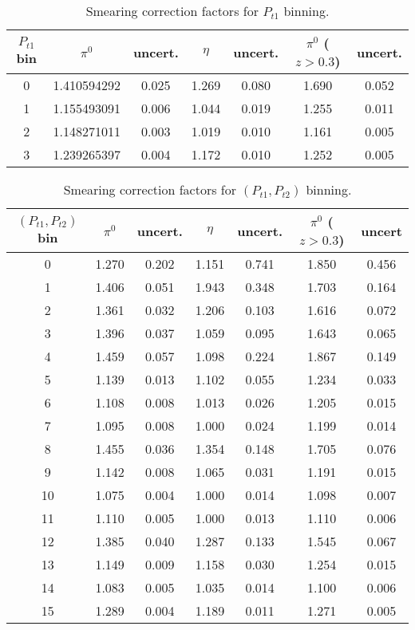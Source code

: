 \begin{table}[H]\footnotesize
\centering
\begin{tabular}{|c||c|c||c|c||c|c|}
 \hline
$P_{t1}$ bin & $\pi^0$ 	&     uncert.  	& $\eta$  		& uncert. 		& $\pi^0$ ($z>0.3$) &  uncert. \\ \hline \hline
0	&	1.410594292	&	0.025	&	1.269	&	0.080	&	1.690	&	0.052	\\ \hline
1	&	1.155493091	&	0.006	&	1.044	&	0.019	&	1.255	&	0.011	\\ \hline
2	&	1.148271011	&	0.003	&	1.019	&	0.010	&	1.161	&	0.005	\\ \hline
3	&	1.239265397	&	0.004	&	1.172	&	0.010	&	1.252	&	0.005	\\ \hline
\end{tabular}
\caption{Smearing correction factors for $P_{t1}$ binning.}
\label{tab:sinpt_smearing_info}
\end{table}

\begin{table}[H]\footnotesize
\centering
\begin{tabular}{|c||c|c||c|c||c|c|}
\hline
$(P_{t1},P_{t2})$ bin & $\pi^0$ 	& uncert. 	& $\eta$  	&  uncert. 		& $\pi^0$ ($z>0.3$) &  uncert\\ \hline \hline
0	&	1.270	&	0.202	&	1.151	&	0.741	&	1.850	&	0.456	\\ \hline
1	&	1.406	&	0.051	&	1.943	&	0.348	&	1.703	&	0.164	\\ \hline
2	&	1.361	&	0.032	&	1.206	&	0.103	&	1.616	&	0.072	\\ \hline
3	&	1.396	&	0.037	&	1.059	&	0.095	&	1.643	&	0.065	\\ \hline \hline
4	&	1.459	&	0.057	&	1.098	&	0.224	&	1.867	&	0.149	\\ \hline
5	&	1.139	&	0.013	&	1.102	&	0.055	&	1.234	&	0.033	\\ \hline
6	&	1.108	&	0.008	&	1.013	&	0.026	&	1.205	&	0.015	\\ \hline
7	&	1.095	&	0.008	&	1.000	&	0.024	&	1.199	&	0.014	\\ \hline \hline
8	&	1.455	&	0.036	&	1.354	&	0.148	&	1.705	&	0.076	\\ \hline
9	&	1.142	&	0.008	&	1.065	&	0.031	&	1.191	&	0.015	\\ \hline
10	&	1.075	&	0.004	&	1.000	&	0.014	&	1.098	&	0.007	\\ \hline
11	&	1.110	&	0.005	&	1.000	&	0.013	&	1.110	&	0.006	\\ \hline \hline
12	&	1.385	&	0.040	&	1.287	&	0.133	&	1.545	&	0.067	\\ \hline
13	&	1.149	&	0.009	&	1.158	&	0.030	&	1.254	&	0.015	\\ \hline
14	&	1.083	&	0.005	&	1.035	&	0.014	&	1.100	&	0.006	\\ \hline
15	&	1.289	&	0.004	&	1.189	&	0.011	&	1.271	&	0.005	\\ \hline
\end{tabular}
\caption{Smearing correction factors for $(P_{t1},P_{t2})$ binning.}
\label{tab:compt_smearing_info}
\end{table}

